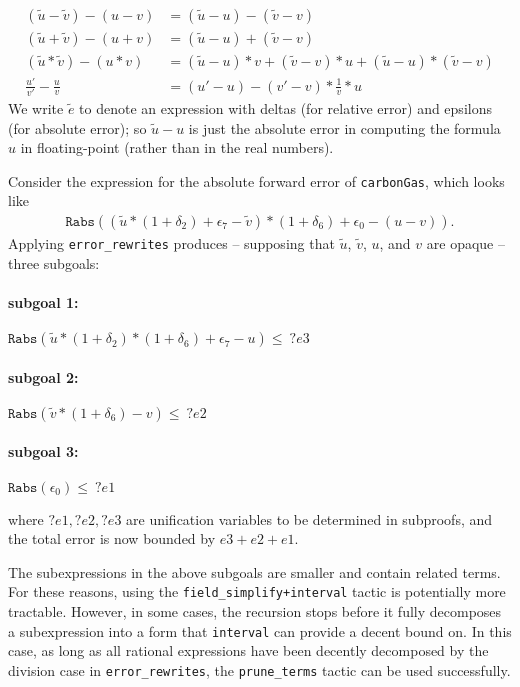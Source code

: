 \documentclass[article]{memoir}
\begin{document}
\begin{align*}
 (\tilde{u} - \tilde{v}) - (u-v) &= (\tilde{u} - u) -
(\tilde{v} - v) \\
 (\tilde{u} + \tilde{v}) - (u+v) &= (\tilde{u} - u) +
(\tilde{v} - v) \\ 
(\tilde{u} * \tilde{v}) - (u*v) &= (\tilde{u} - u)*v +
(\tilde{v} - v)*u + (\tilde{u} - u)*(\tilde{v} - v) \\
\frac{u'}{v'} - \frac{u}{v} &= (u'-u) - (v'-v) * \frac{1}{v} * 
u
\end{align*}
We write $\tilde{e}$ to denote an expression with 
deltas (for relative error) and epsilons (for absolute error); 
so $\tilde{u} - u$ is just the absolute error in computing the 
formula $u$ in floating-point (rather than in the real numbers).

Consider the expression for the absolute
forward error of \lstinline{carbonGas}, which looks like 
\begin{align*}
 \texttt{Rabs}((\tilde{u}*(1+\delta_2) + \epsilon_7 - 
 \tilde{v}) * (1 + \delta_6) + \epsilon_0 - (u - v)).
\end{align*}
Applying \lstinline{error_rewrites}
produces -- supposing that $\tilde{u}$, $\tilde{v}$, $u$, and 
$v$ are 
opaque -- three subgoals:
\paragraph{subgoal 1:}$\texttt{Rabs} (\tilde{u}*(1+\delta_2)*(1 
+ \delta_6) + 
\epsilon_7 -  u) \le \ ?e3$

\paragraph{subgoal 2:}
$\texttt{Rabs}(\tilde{v} * (1 + \delta_6) - v)  \le \ ?e2$

\paragraph{subgoal 3:}
$\texttt{Rabs}(\epsilon_0) \le \ ?e1$

\noindent where $?e1,?e2,?e3$ are unification variables
to be determined in subproofs, and
the total error is now bounded by $e3 + e2 + e1$. 

The subexpressions in the above subgoals are smaller 
and 
contain related terms. For these reasons, using the 
\lstinline{field_simplify+interval} tactic is potentially more 
tractable. However, in 
some cases, the recursion stops before it fully decomposes a 
subexpression into a form that \lstinline{interval} can provide 
a decent bound on. In this case, as long as all rational 
expressions have been decently decomposed by the division case 
in \lstinline{error_rewrites}, the \lstinline{prune_terms} tactic can 
be used successfully. 
\end{document}
